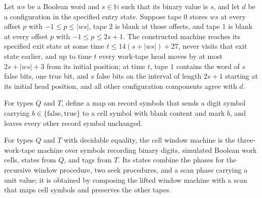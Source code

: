 \begin{theorem}
\label{Turing.rt_window_run}
\leanok
{}
Let $ws$ be a Boolean word and $s\in\mathbb N$ such that its binary value is $s$, and
let $d$ be a configuration in the specified entry state. Suppose tape $0$ stores $ws$ at
every offset $p$ with $-1\le p\le |ws|$, tape $2$ is blank at those offsets, and tape
$1$ is blank at every offset $p$ with $-1\le p\le 2s+1$. The constructed machine reaches
its specified exit state at some time $t\le14(s+|ws|)+27$, never visits that exit state
earlier, and up to time $t$ every work-tape head moves by at most $2s+|ws|+3$ from its
initial position; at time $t$, tape $1$ contains the word of $s$ false bits, one true
bit, and $s$ false bits on the interval of length $2s+1$ starting at its initial head
position, and all other configuration components agree with $d$.
\end{theorem}

\begin{definition}
\label{Turing.rt_windowCellMap}
\leanok
{}
For types $Q$ and $T$, define a map on record symbols that sends a digit symbol carrying
$b\in\{\mathrm{false},\mathrm{true}\}$ to a cell symbol with blank content and mark $b$,
and leaves every other record symbol unchanged.
\end{definition}

\begin{definition}
\label{Turing.rt_cellWindowTM}
\leanok
{}
For types $Q$ and $T$ with decidable equality, the cell window machine is the
three-work-tape machine over symbols recording binary digits, simulated Boolean work
cells, states from $Q$, and tags from $T$. Its states combine the phases for the
recursive window procedure, two seek procedures, and a scan phase carrying a unit value;
it is obtained by composing the lifted window machine with a scan that maps cell symbols
and preserves the other tapes.
\end{definition}

